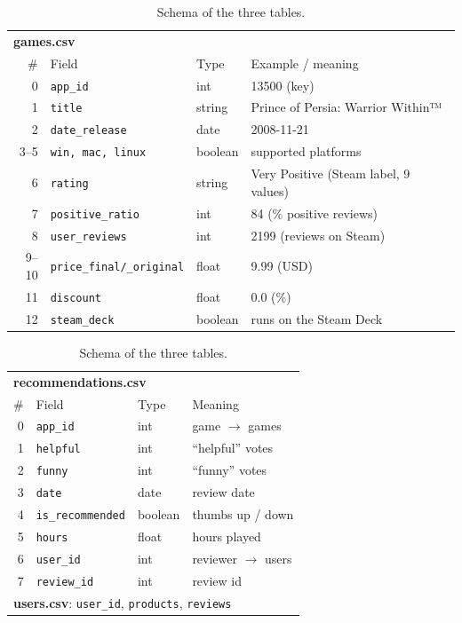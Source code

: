 \documentclass[11pt,a4paper]{article}
\newcommand{\code}[1]{\texttt{#1}}
\begin{document}
\begin{table}[H]\centering\scriptsize\setlength{\tabcolsep}{3pt}
\begin{minipage}[t]{0.55\linewidth}\centering
\begin{tabular}{rlll}
\toprule
\multicolumn{4}{l}{\textbf{games.csv}} \\
\# & Field & Type & Example / meaning \\
\midrule
0  & \code{app\_id}         & int     & 13500 (key) \\
1  & \code{title}           & string  & Prince of Persia: Warrior Within™ \\
2  & \code{date\_release}   & date    & 2008-11-21 \\
3–5 & \code{win, mac, linux} & boolean & supported platforms \\
6  & \code{rating}          & string  & Very Positive (Steam label, 9 values) \\
7  & \code{positive\_ratio} & int     & 84 (\% positive reviews) \\
8  & \code{user\_reviews}   & int     & 2199 (reviews on Steam) \\
9–10 & \code{price\_final/\_original} & float & 9.99 (USD) \\
11 & \code{discount}        & float   & 0.0 (\%) \\
12 & \code{steam\_deck}     & boolean & runs on the Steam Deck \\
\bottomrule
\end{tabular}
\end{minipage}\hfill
\begin{minipage}[t]{0.43\linewidth}\centering
\begin{tabular}{rlll}
\toprule
\multicolumn{4}{l}{\textbf{recommendations.csv}} \\
\# & Field & Type & Meaning \\
\midrule
0 & \code{app\_id}         & int     & game $\rightarrow$ games \\
1 & \code{helpful}         & int     & ``helpful'' votes \\
2 & \code{funny}           & int     & ``funny'' votes \\
3 & \code{date}            & date    & review date \\
4 & \code{is\_recommended} & boolean & thumbs up / down \\
5 & \code{hours}           & float   & hours played \\
6 & \code{user\_id}        & int     & reviewer $\rightarrow$ users \\
7 & \code{review\_id}      & int     & review id \\
\midrule
\multicolumn{4}{l}{\textbf{users.csv}: \code{user\_id}, \code{products}, \code{reviews}} \\
\bottomrule
\end{tabular}
\end{minipage}
\caption{Schema of the three tables.}
\end{table}
\end{document}
